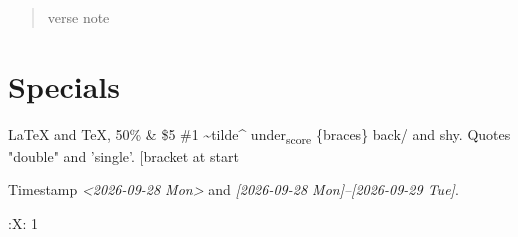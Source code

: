 \begin{verse}
verse note\footnotemark\\
\end{verse}
\section{Specials}
\label{sec:org948d328}
\LaTeX{} and \TeX{}, 50\% \& \$5 \#1 \textasciitilde{}tilde\^{} under\textsubscript{score} \{braces\} back/ and \-shy.
Quotes "double" and 'single'.
{[}bracket at start
\newpage
\listoftables
Timestamp \textit{<2026-09-28 Mon> } and \textit{{[}2026-09-28 Mon]--[2026-09-29 Tue]}.

\begin{center}
\end{center}

:X: 1
